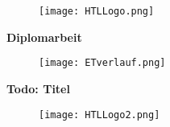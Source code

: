 
\newpage
\begin{figure}
\begin{center}
\texttt{[image: HTLLogo.png]}
\end{center}
\end{figure}

\vspace*{0cm}

\begin{center}
\Huge{\textbf{Diplomarbeit}}
\end{center}
\vspace*{-0.5cm}
\begin{figure}[h]
\begin{center}
\texttt{[image: ETverlauf.png]}
\end{center}
\end{figure}


\begin{center}
\textbf{\Huge{Todo: Titel}}
\end{center}
  
  

  
  
  
  
  
  
    
\begin{figure}[b]
\begin{center}
\texttt{[image: HTLLogo2.png]}
\end{center}
\end{figure}
